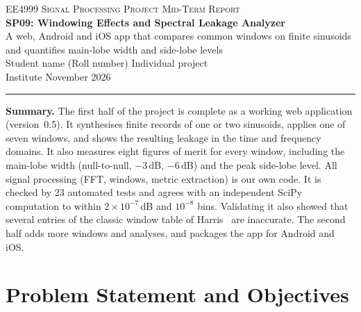 \documentclass[11pt,a4paper]{article}
\newcommand{\StudentName}{Student name}%
\newcommand{\RollNo}{Roll number}%
\newcommand{\Institute}{Institute}}
\begin{document}
\begin{center}
  {\small\textsc{EE4999 Signal Processing Project \textperiodcentered{} Mid-Term Report}}\\[8pt]
  {\LARGE\bfseries SP09: Windowing Effects and Spectral Leakage Analyzer}\\[6pt]
  {\large A web, Android and iOS app that compares common windows on finite sinusoids\\
  and quantifies main-lobe width and side-lobe levels}\\[10pt]
  \StudentName{} (\RollNo) \quad\textbar\quad Individual project\\[2pt]
  \Institute{} \quad\textbar\quad November 2026
\end{center}
\vspace{2pt}
\noindent\rule{\linewidth}{0.4pt}

\textbf{Summary.} The first half of the project is complete as a working web application
(version~0.5). It synthesises finite records of one or two sinusoids, applies one of seven
windows, and shows the resulting leakage in the time and frequency domains. It also measures
eight figures of merit for every window, including the main-lobe width (null-to-null,
$-3$\,dB, $-6$\,dB) and the peak side-lobe level. All signal processing (FFT, windows, metric
extraction) is our own code. It is checked by 23 automated tests and agrees with an
independent SciPy computation to within $2\times10^{-7}$\,dB and $10^{-8}$ bins. Validating it
also showed that several entries of the classic window table of Harris~\cite{harris} are
inaccurate. The second half adds more windows and analyses, and packages the app for Android
and iOS.

\section{Problem Statement and Objectives}
\end{document}
